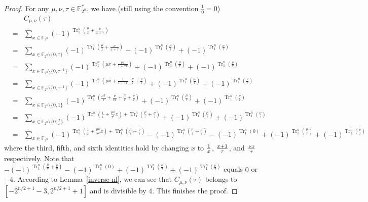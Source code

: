 \documentclass{article}
\newcommand{\F}{\mathbb{F}}
\newcommand{\TrN}{\operatorname{Tr}_1^n}
\newtheorem{lemma}{Lemma}
\theoremstyle{nonumberplain}
\newtheorem{proof}{Proof}
\newcommand{\0}{\textbf{0}}
\newcommand{\1}{\textbf{1}}
\begin{document}
    \begin{proof} For any $\mu,\nu,\tau\in\F_{2^n}^*$,
     we have (still using the convention $\frac 10=0$)
    \begin{eqnarray*}
    &&C_{{\mu,\nu}}(\tau)\\
    &=&\sum_{x\in\F_{2^n}}(-1)^{\TrN(\frac{\mu}{x}+\frac{\nu}{x+\tau})}\\
    &=&\sum_{x\in\F_{2^n}\setminus\{0,\tau\}}(-1)^{\TrN(\frac{\mu}{x}+\frac{\nu}{x+\tau})}+(-1)^{\TrN(\frac{\mu}{\tau})}+(-1)^{\TrN(\frac{\nu}{\tau})}\\
    &=&\sum_{x\in\F_{2^n}\setminus\{0,\tau^{-1}\}}(-1)^{\TrN(\mu x+\frac{\nu x}{1+\tau x})}+(-1)^{\TrN(\frac{\mu}{\tau})}+(-1)^{\TrN(\frac{\nu}{\tau})}\\
    &=&\sum_{x\in\F_{2^n}\setminus\{0,\tau^{-1}\}}(-1)^{\TrN(\mu x+\frac{1}{1+\tau x}\cdot\frac{\nu}{\tau}+\frac{\nu}{\tau})}+(-1)^{\TrN(\frac{\mu}{\tau})}+(-1)^{\TrN(\frac{\nu}{\tau})}\\
    &=&\sum_{x\in\F_{2^n}\setminus\{0,1\}}(-1)^{\TrN(\frac{\mu x}{\tau}+\frac{\nu}{\tau x}+\frac{\mu}{\tau}+\frac{\nu}{\tau})}+(-1)^{\TrN(\frac{\mu}{\tau})}+(-1)^{\TrN(\frac{\nu}{\tau})}\\
    &=&\sum_{x\in\F_{2^n}\setminus\{0,\frac{\tau}{\nu}\}}(-1)^{\TrN(\frac{1}{x}+\frac{\mu \nu}{\tau^2}x)+\TrN(\frac{\mu}{\tau}+\frac{\nu}{\tau})}+(-1)^{\TrN(\frac{\mu}{\tau})}+(-1)^{\TrN(\frac{\nu}{\tau})}\\
    &=&\sum_{x\in\F_{2^n}}(-1)^{\TrN(\frac{1}{x}+\frac{\mu \nu}{\tau^2}x)+\TrN(\frac{\mu}{\tau}+\frac{\nu}{\tau})}-
    (-1)^{\TrN(\frac{\mu}{\tau}+\frac{\nu}{\tau})}-(-1)^{\TrN(0)}+(-1)^{\TrN(\frac{\mu}{\tau})}+(-1)^{\TrN(\frac{\nu}{\tau})}
   \end{eqnarray*}
   where the third, fifth, and sixth identities hold by changing $x$ to ${1\over x}$, ${x+1\over \tau}$, and ${\nu x\over \tau}$ respectively.
   Note that $-(-1)^{\TrN(\frac{\mu}{\tau}+\frac{\nu}{\tau})}-(-1)^{\TrN(0)}+(-1)^{\TrN(\frac{\mu}{\tau})}+(-1)^{\TrN(\frac{\nu}{\tau})}$
   equals $0$ or $-4$. According to Lemma~\ref{inverse-nl}, we can see that $C_{{\mu,\nu}}(\tau)$ belongs to $[-2^{{n/2}+1}-3, 2^{{n/2}+1}+1]$ and is divisible by $4$.
   This finishes the proof.
   \end{proof}
\end{document}
